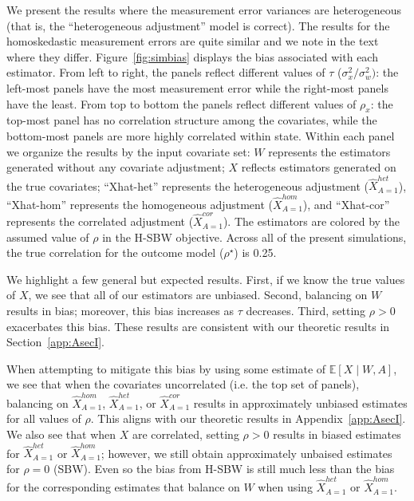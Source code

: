 We present the results where the measurement error variances are heterogeneous (that is, the ``heterogeneous adjustment'' model is correct). The results for the homoskedastic measurement errors are quite similar and we note in the text where they differ. Figure~\ref{fig:simbias} displays the bias associated with each estimator. From left to right, the panels reflect different values of $\tau$ ($\sigma^2_x/\sigma^2_w)$: the left-most panels have the most measurement error while the right-most panels have the least. From top to bottom the panels reflect different values of $\rho_x$: the top-most panel has no correlation structure among the covariates, while the bottom-most panels are more highly correlated within state. Within each panel we organize the results by the input covariate set: $W$ represents the estimators generated without any covariate adjustment; $X$ reflects estimators generated on the true covariates; ``Xhat-het'' represents the heterogeneous adjustment ($\hat{X}_{A=1}^{het}$), ``Xhat-hom'' represents the homogeneous adjustment ($\hat{X}_{A=1}^{hom}$), and ``Xhat-cor'' represents the correlated adjustment ($\hat{X}_{A=1}^{cor}$). The estimators are colored by the assumed value of $\rho$ in the H-SBW objective. Across all of the present simulations, the true correlation for the outcome model ($\rho^\star$) is 0.25.

We highlight a few general but expected results. First, if we know the true values of $X$, we see that all of our estimators are unbiased. Second, balancing on $W$ results in bias; moreover, this bias increases as $\tau$ decreases. Third, setting $\rho > 0$ exacerbates this bias. These results are consistent with our theoretic results in Section~\ref{app:AsecI}.

When attempting to mitigate this bias by using some estimate of $\mathbb{E}[X \mid W, A]$, we see that when the covariates  uncorrelated (i.e. the top set of panels), balancing on $\hat{X}_{A=1}^{hom}$, $\hat{X}_{A=1}^{het}$, or $\hat{X}_{A=1}^{cor}$ results in approximately unbiased estimates for all values of $\rho$. This aligns with our theoretic results in Appendix~\ref{app:AsecI}. We also see that when $X$ are correlated, setting $\rho > 0$ results in biased estimates for $\hat{X}_{A=1}^{het}$ or $\hat{X}_{A=1}^{hom}$; however, we still obtain approximately unbaised estimates for $\rho = 0$ (SBW). Even so the bias from H-SBW is still much less than the bias for the corresponding estimates that balance on $W$ when using $\hat{X}_{A=1}^{het}$ or $\hat{X}_{A=1}^{hom}$.

